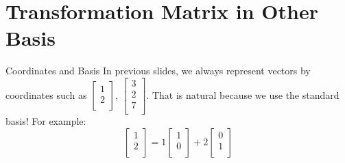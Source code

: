\documentclass{beamer}
\begin{document}
\section{Transformation Matrix in Other Basis}
\begin{frame}{Coordinates and Basis}
In previous slides, we always represent vectors by coordinates such as $\left[ \begin{array}{c}
	1\\
	2\\
\end{array} \right]$, $\left[ \begin{array}{c}
	3\\
	2\\
    7\\
\end{array} \right]$. That is natural because we use the standard basis! For example:
\begin{equation*}
    \left[ \begin{array}{c}
        1\\
        2\\
    \end{array} \right] =1\left[ \begin{array}{c}
        1\\
        0\\
    \end{array} \right] +2\left[ \begin{array}{c}
        0\\
        1\\
    \end{array} \right]
\end{equation*}


\end{frame}
\end{document}
